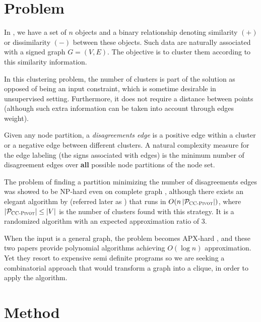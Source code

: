 \section{Problem}

In \pcc{}, we have a set of $n$ objects and a binary relationship denoting
similarity $(+)$  or dissimilarity $(-)$ between these objects. Such data are
naturally associated with a signed graph $G=(V,E)$. The objective is to
cluster them according to this similarity information.

In this clustering problem, the number of clusters is part of the solution as
opposed of being an input constraint, which is sometime desirable in
unsupervised setting. Furthermore, it does not require a distance between
points (although such extra information can be taken into account through
edges weight).

Given any node partition, a \emph{disagreements edge} is a positive edge within a
cluster or a negative edge between different clusters. A natural complexity
measure for the edge labeling (the signs associated with edges) is the minimum
number of disagreement edges over \textbf{all} possible node partitions of the node
set.

\medskip

The problem of finding a partition minimizing the number of disagreements
edges was showed to be NP-hard even on complete graph \autocite{Bansal2002},
although there exists an elegant algorithm by \textcite{Ailon2008} (referred
later as \ccp{}) that runs in $O(n\left|\mathcal{P}_{\text{\textsc{CC-Pivot}{}}}\right|)$,
where $\left|\mathcal{P}_{\text{\textsc{CC-Pivot}{}}}\right| \le |V|$ is the number of
clusters found with this strategy. It is a randomized algorithm with an
expected approximation ratio of $3$.

When the input is a general graph, the problem becomes APX-hard
\autocites{Charikar2003}{Demaine2006}, and these two papers provide polynomial
algorithms achieving $O(\log n)$ approximation. Yet they resort to expensive
semi definite programs so we are seeking a combinatorial approach that would
transform a graph into a clique, in order to apply the \ccp{} algorithm.

\section{Method}

